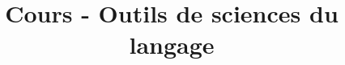 \documentclass[a4paper,12pt]{article}
\begin{document}
\title{Cours - Outils de sciences du langage}
\maketitle
\tableofcontents
\newpage

\end{document}
